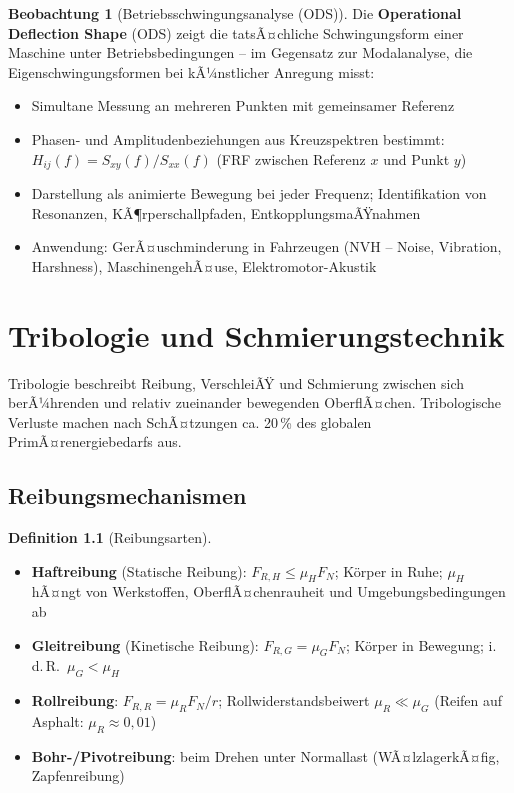 ﻿\documentclass[a4paper,12pt]{report}
\theoremstyle{definition}
\newtheorem{definition}{Definition}
\newtheorem{beobachtung}{Beobachtung}
\begin{document}
\begin{beobachtung}[Betriebsschwingungsanalyse (ODS)]
Die \textbf{Operational Deflection Shape} (ODS) zeigt die tatsÃ¤chliche
Schwingungsform einer Maschine unter Betriebsbedingungen --
im Gegensatz zur Modalanalyse, die Eigenschwingungsformen bei
kÃ¼nstlicher Anregung misst:
\begin{itemize}
    \item[-] Simultane Messung an mehreren Punkten mit gemeinsamer Referenz
    \item[-] Phasen- und Amplitudenbeziehungen aus Kreuzspektren bestimmt:
          $H_{ij}(f) = S_{xy}(f)/S_{xx}(f)$ (FRF zwischen Referenz $x$ und Punkt $y$)
    \item[-] Darstellung als animierte Bewegung bei jeder Frequenz;
          Identifikation von Resonanzen, KÃ¶rperschallpfaden, EntkopplungsmaÃŸnahmen
    \item[-] Anwendung: GerÃ¤uschminderung in Fahrzeugen (NVH -- Noise, Vibration, Harshness),
          MaschinengehÃ¤use, Elektromotor-Akustik
\end{itemize}
\end{beobachtung}

\chapter{Tribologie und Schmierungstechnik}

Tribologie beschreibt Reibung, VerschleiÃŸ und Schmierung zwischen
sich berÃ¼hrenden und relativ zueinander bewegenden OberflÃ¤chen.
Tribologische Verluste machen nach SchÃ¤tzungen ca. 20\,\% des
globalen PrimÃ¤renergiebedarfs aus.

\section{Reibungsmechanismen}

\begin{definition}[Reibungsarten]
\begin{itemize}
    \item[-] \textbf{Haftreibung} (Statische Reibung): $F_{R,H} \le \mu_H F_N$;
          K\"orper in Ruhe; $\mu_H$ hÃ¤ngt von Werkstoffen, OberflÃ¤chenrauheit
          und Umgebungsbedingungen ab
    \item[-] \textbf{Gleitreibung} (Kinetische Reibung): $F_{R,G} = \mu_G F_N$;
          K\"orper in Bewegung; i.\,d.\,R.\ $\mu_G < \mu_H$
    \item[-] \textbf{Rollreibung}: $F_{R,R} = \mu_R F_N / r$;
          Rollwiderstandsbeiwert $\mu_R \ll \mu_G$ (Reifen auf Asphalt: $\mu_R \approx 0{,}01$)
    \item[-] \textbf{Bohr-/Pivotreibung}: beim Drehen unter Normallast
          (WÃ¤lzlagerkÃ¤fig, Zapfenreibung)
\end{itemize}
\end{definition}
\end{document}
